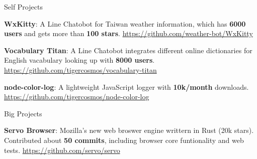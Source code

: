 

\begin{cventries}

  \cventry
    {} %
    {Self Projects} %
    {} %
    {} %
    {
      \vspace{-2mm}
      \begin{cvitems} %
        \item {\textbf{WxKitty}: A Line Chatobot for Taiwan weather information, which has \textbf{6000 users}
        and gets more than \textbf{100 stars}. \url{https://github.com/weather-bot/WxKitty}}
        \item {\textbf{Vocabulary Titan}: A Line Chatobot integrates different online dictionaries for English vacabulary looking up
        with \textbf{8000 users}. \url{https://github.com/tigercosmos/vocabulary-titan}}
        \item {\textbf{node-color-log}: A lightweight JavaScript logger with \textbf{10k/month} downloads. \url{https://github.com/tigercosmos/node-color-log}}
      \end{cvitems}
    }
  \vspace{-2mm}
  \cventry
    {} %
    {Big Projects} %
    {} %
    {} %
    {
      \vspace{-2mm}
      \begin{cvitems} %
        \item {\textbf{Servo Browser}: Mozilla's new web broswer engine writtern in Rust (20k stars).
        Contributed about \textbf{50 commits}, including browser core funtionality and web tests.
        \url{https://github.com/servo/servo}
        }
      \end{cvitems}
    }

\end{cventries}
